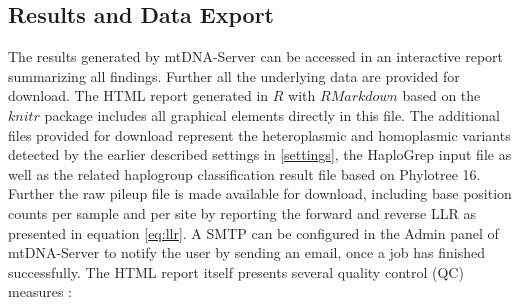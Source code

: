 \subsection{Results and Data Export}
The results generated by mtDNA-Server can be accessed in an interactive report summarizing all findings. Further all the underlying data are provided for download. The HTML report generated in $R$ with $RMarkdown$ based on the $knitr$ package includes all graphical elements directly in this file. The additional files provided for download represent the  heteroplasmic and homoplasmic variants detected by the earlier described settings in \ref{settings}, the HaploGrep input file as well as the related haplogroup classification result file based on Phylotree 16. Further the raw pileup file is made available for download, including base position counts per sample and per site by reporting the forward and reverse LLR as presented in equation \ref{eq:llr}. A SMTP can be configured in the Admin panel of mtDNA-Server to notify the user by sending an email, once a job has finished successfully. The HTML report itself presents several quality control (QC) measures  \cite{Weissensteiner2016b}: 
